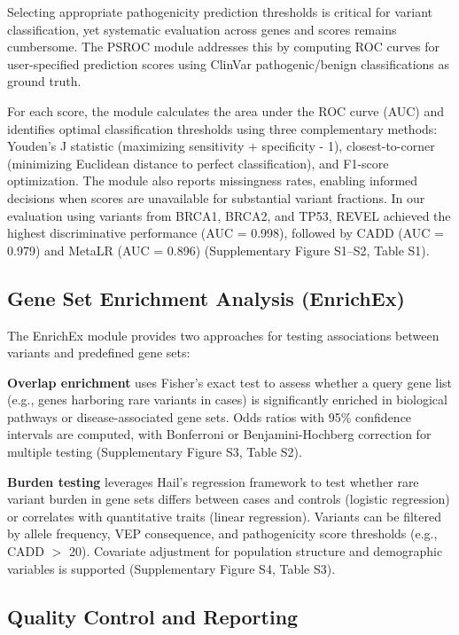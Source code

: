 \documentclass[11pt]{article}
\begin{document}
Selecting appropriate pathogenicity prediction thresholds is critical for variant classification, yet systematic evaluation across genes and scores remains cumbersome. The PSROC module addresses this by computing ROC curves for user-specified prediction scores using ClinVar pathogenic/benign classifications as ground truth.

For each score, the module calculates the area under the ROC curve (AUC) and identifies optimal classification thresholds using three complementary methods: Youden's J statistic (maximizing sensitivity + specificity - 1), closest-to-corner (minimizing Euclidean distance to perfect classification), and F1-score optimization. The module also reports missingness rates, enabling informed decisions when scores are unavailable for substantial variant fractions. In our evaluation using variants from BRCA1, BRCA2, and TP53, REVEL achieved the highest discriminative performance (AUC = 0.998), followed by CADD (AUC = 0.979) and MetaLR (AUC = 0.896) (Supplementary Figure S1--S2, Table S1).

\subsection{Gene Set Enrichment Analysis (EnrichEx)}

The EnrichEx module provides two approaches for testing associations between variants and predefined gene sets:

\textbf{Overlap enrichment} uses Fisher's exact test to assess whether a query gene list (e.g., genes harboring rare variants in cases) is significantly enriched in biological pathways or disease-associated gene sets. Odds ratios with 95\% confidence intervals are computed, with Bonferroni or Benjamini-Hochberg correction for multiple testing (Supplementary Figure S3, Table S2).

\textbf{Burden testing} leverages Hail's regression framework to test whether rare variant burden in gene sets differs between cases and controls (logistic regression) or correlates with quantitative traits (linear regression). Variants can be filtered by allele frequency, VEP consequence, and pathogenicity score thresholds (e.g., CADD $>$ 20). Covariate adjustment for population structure and demographic variables is supported (Supplementary Figure S4, Table S3).

\subsection{Quality Control and Reporting}
\end{document}
